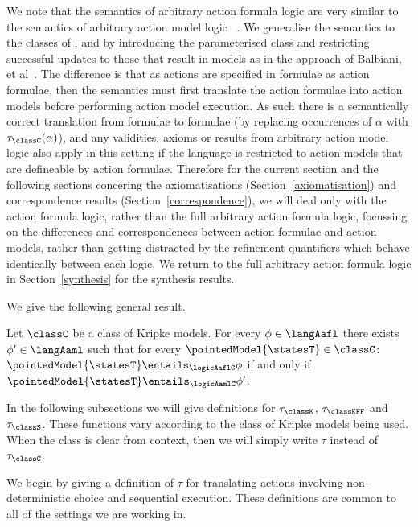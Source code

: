 \documentclass[twoside]{aiml14}
\begin{document}
  We note that the semantics of arbitrary action formula logic \logicAaflC{} are very similar
  to the semantics of arbitrary action model logic \logicAamlC{}~\cite{hales2013}. 
  We generalise the semantics to the classes of \classK{}, \classKFF{} and
  \classS{} by introducing the parameterised class \classC{} and restricting
  successful updates to those that result in \classC{} models as in the
  approach of Balbiani, et al~\cite{balbiani2012}.
  The difference is that as actions are specified in \langAafl{} formulae as
  action formulae, then the semantics must first translate the action formulae
  into action models before performing action model execution. As such there is
  a semantically correct translation from \langAafl{} formulae to \langAaml{}
  formulae (by replacing occurrences of $\alpha$ with $\tau_\classC(\alpha)$),
  and any validities, axioms or results from arbitrary action model logic also
  apply in this setting if the language is restricted to action models that are
  defineable by action formulae. Therefore for the current section and the
  following sections concering the axiomatisations
  (Section~\ref{axiomatisation}) and correspondence results
  (Section~\ref{correspondence}), we will deal only with the action formula
  logic, rather than the full arbitrary action formula logic, focussing on the
  differences and correspondences between action formulae and action models,
  rather than getting distracted by the refinement quantifiers which behave
  identically between each logic. We return to the full arbitrary action
  formula logic in Section~\ref{synthesis} for the synthesis results.

  We give the following general result.

  \begin{proposition}
      Let $\classC$ be a class of Kripke models. For every $\phi \in \langAafl$
      there exists $\phi' \in \langAaml$ 
      such that for every $\pointedModel{\statesT} \in \classC$: 
      $\pointedModel{\statesT} \entails_\logicAaflC \phi$ if and only if
      $\pointedModel{\statesT} \entails_\logicAamlC \phi'$.
  \end{proposition}

  In the following subsections we will give definitions for $\tau_\classK$,
  $\tau_\classKFF$ and $\tau_\classS$. These functions vary according to the
  class of Kripke models being used. When the class is clear from context, then
  we will simply write $\tau$ instead of $\tau_\classC$.

  We begin by giving a definition of $\tau$ for translating actions involving
  non-deterministic choice and sequential execution. These definitions are
  common to all of the settings we are working in.
\end{document}
